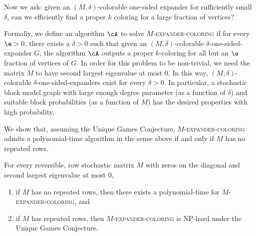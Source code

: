 Now we ask: given an \((M,\delta)\)-colorable one-sided expander for sufficiently small \(\delta\), can we efficiently find a proper \(k\) coloring for a large fraction of vertices?

Formally, we define an algorithm \(\cA\) to solve \(M\)-\textsc{expander-coloring} if for every \(\e>0\), there exists a \(\delta>0\) such that given an \((M,\delta)\)-colorable \(\delta\)-one-sided-expander \(G\), the algorithm \(\cA\) outputs a proper \(k\)-coloring for all but an \(\e\) fraction of vertices of \(G\).
In order for this problem to be non-trivial, we need the matrix \(M\) to have second largest eigenvalue at most \(0\).
In this way, \((M,\delta)\)-colorable \(\delta\)-one-sided-expanders exist for every \(\delta>0\).
In particular, a stochastic block model graph with large enough degree parameter (as a function of \(\delta\)) and suitable block probabilities (as a function of \(M\)) has the desired properties with high probability.

We show that, assuming the Unique Games Conjecture, \(M\)-\textsc{expander-coloring} admits a polynomial-time algorithm in the sense above if and only if \(M\) has no repeated rows.

\begin{theorem}
  For every reversible, row stochastic matrix \(M\) with zeros on the diagonal and second largest eigenvalue at most \(0\),
  \begin{enumerate}
  \item if \(M\) has no repeated rows, then there exists a polynomial-time for \(M\)-\textsc{expander-coloring}, and
  \item if \(M\) has repeated rows, then \(M\)-\textsc{expander-coloring} is NP-hard under the Unique Games Conjecture.
  \end{enumerate}
\end{theorem}

